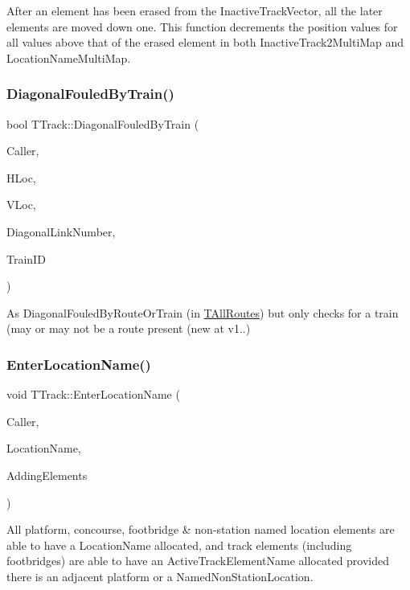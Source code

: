 After an element has been erased from the Inactive\+Track\+Vector, all the later elements are moved down one. This function decrements the position values for all values above that of the erased element in both Inactive\+Track2\+Multi\+Map and Location\+Name\+Multi\+Map. \mbox{\label{class_t_track_a3b4a2e8a16c61a4286fcf34adb000819}} 
\subsubsection{\texorpdfstring{Diagonal\+Fouled\+By\+Train()}{DiagonalFouledByTrain()}}
{\footnotesize\ttfamily bool T\+Track\+::\+Diagonal\+Fouled\+By\+Train (\begin{DoxyParamCaption}\item[{int}]{Caller,  }\item[{int}]{H\+Loc,  }\item[{int}]{V\+Loc,  }\item[{int}]{Diagonal\+Link\+Number,  }\item[{int \&}]{Train\+ID }\end{DoxyParamCaption})}

As Diagonal\+Fouled\+By\+Route\+Or\+Train (in \mbox{\hyperlink{class_t_all_routes}{T\+All\+Routes}}) but only checks for a train (may or may not be a route present (new at v1..) \mbox{\label{class_t_track_a433736aed04f76b3d0c39f0696c3bb18}} 
\subsubsection{\texorpdfstring{Enter\+Location\+Name()}{EnterLocationName()}}
{\footnotesize\ttfamily void T\+Track\+::\+Enter\+Location\+Name (\begin{DoxyParamCaption}\item[{int}]{Caller,  }\item[{Ansi\+String}]{Location\+Name,  }\item[{bool}]{Adding\+Elements }\end{DoxyParamCaption})}

All platform, concourse, footbridge \& non-\/station named location elements are able to have a Location\+Name allocated, and track elements (including footbridges) are able to have an Active\+Track\+Element\+Name allocated provided there is an adjacent platform or a Named\+Non\+Station\+Location.

